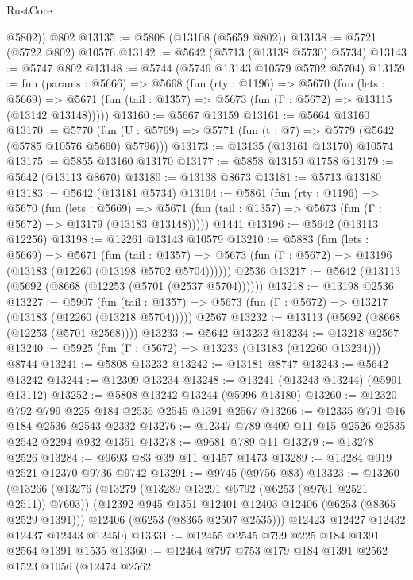 \begin{lexlean}{RustCore}
\begin{coremodule}
        @5802))
    @802
@13135 := @5808 (@13108 (@5659 @802))
@13138 := @5721 (@5722 @802) @10576
@13142 := @5642 (@5713 (@13138 @5730) @5734)
@13143 := @5747 @802
@13148 := @5744 (@5746 @13143 @10579 @5702 @5704)
@13159 := fun (params : @5666) =>
  @5668
    (fun (rty : @1196) =>
    @5670
      (fun (lets : @5669) =>
      @5671 (fun (tail : @1357) => @5673 (fun (Γ : @5672) => @13115 (@13142 @13148)))))
@13160 := @5667 @13159
@13161 := @5664 @13160
@13170 := @5770
    (fun (U : @5769) => @5771 (fun (t : @7) => @5779 (@5642 (@5785 @10576 @5660) @5796)))
@13173 := @13135 (@13161 @13170) @10574
@13175 := @5855 @13160 @13170
@13177 := @5858 @13159 @1758
@13179 := @5642 (@13113 @8670)
@13180 := @13138 @8673
@13181 := @5713 @13180
@13183 := @5642 (@13181 @5734)
@13194 := @5861
    (fun (rty : @1196) =>
    @5670
      (fun (lets : @5669) =>
      @5671 (fun (tail : @1357) => @5673 (fun (Γ : @5672) => @13179 (@13183 @13148)))))
    @1441
@13196 := @5642 (@13113 @12256)
@13198 := @12261 @13143 @10579
@13210 := @5883
    (fun (lets : @5669) =>
    @5671
      (fun (tail : @1357) =>
      @5673 (fun (Γ : @5672) => @13196 (@13183 (@12260 (@13198 @5702 @5704))))))
    @2536
@13217 := @5642 (@13113 (@5692 (@8668 (@12253 (@5701 (@2537 @5704))))))
@13218 := @13198 @2536
@13227 := @5907
    (fun (tail : @1357) => @5673 (fun (Γ : @5672) => @13217 (@13183 (@12260 (@13218 @5704)))))
    @2567
@13232 := @13113 (@5692 (@8668 (@12253 (@5701 @2568))))
@13233 := @5642 @13232
@13234 := @13218 @2567
@13240 := @5925 (fun (Γ : @5672) => @13233 (@13183 (@12260 @13234))) @8744
@13241 := @5808 @13232
@13242 := @13181 @8747
@13243 := @5642 @13242
@13244 := @12309 @13234
@13248 := @13241 (@13243 @13244) (@5991 @13112)
@13252 := @5808 @13242 @13244 (@5996 @13180)
@13260 := @12320 @792 @799 @225 @184 @2536 @2545 @1391 @2567
@13266 := @12335 @791 @16 @184 @2536 @2543 @2332
@13276 := @12347 @789 @409 @11 @15 @2526 @2535 @2542 @2294 @932 @1351
@13278 := @9681 @789 @11
@13279 := @13278 @2526
@13284 := @9693 @83 @39 @11 @1457 @1473
@13289 := @13284 @919 @2521 @12370 @9736 @9742
@13291 := @9745 (@9756 @83)
@13323 := @13260
    (@13266
      (@13276
        (@13279 (@13289 @13291 @6792 (@6253 (@9761 @2521 @2511)) @7603))
        (@12392 @945 @1351 @12401 @12403 @12406 (@6253 (@8365 @2529 @1391)))
        @12406
        (@6253 (@8365 @2507 @2535)))
      @12423
      @12427
      @12432
      @12437
      @12443
      @12450)
@13331 := @12455 @2545 @799 @225 @184 @1391 @2564 @1391 @1535
@13360 := @12464
    @797
    @753
    @179
    @184
    @1391
    @2562
    @1523
    @1056
    (@12474
      @2562

\end{coremodule}
\end{lexlean}
